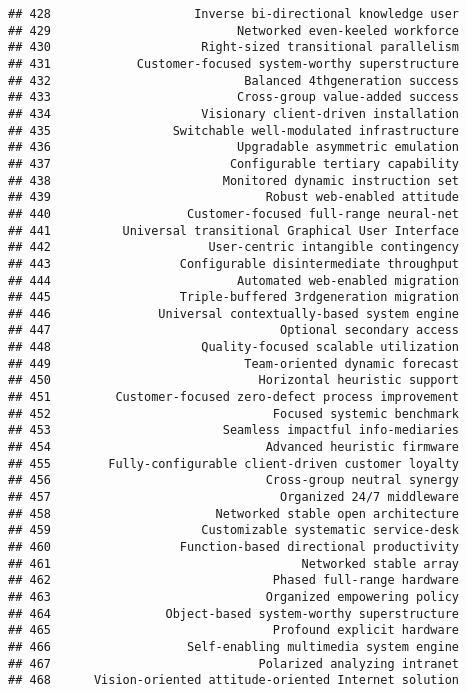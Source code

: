 \documentclass[
]{article}
\begin{document}
\begin{verbatim}
## 428                    Inverse bi-directional knowledge user
## 429                          Networked even-keeled workforce
## 430                     Right-sized transitional parallelism
## 431            Customer-focused system-worthy superstructure
## 432                           Balanced 4thgeneration success
## 433                          Cross-group value-added success
## 434                     Visionary client-driven installation
## 435                 Switchable well-modulated infrastructure
## 436                          Upgradable asymmetric emulation
## 437                         Configurable tertiary capability
## 438                        Monitored dynamic instruction set
## 439                              Robust web-enabled attitude
## 440                   Customer-focused full-range neural-net
## 441          Universal transitional Graphical User Interface
## 442                      User-centric intangible contingency
## 443                  Configurable disintermediate throughput
## 444                          Automated web-enabled migration
## 445                  Triple-buffered 3rdgeneration migration
## 446               Universal contextually-based system engine
## 447                                Optional secondary access
## 448                     Quality-focused scalable utilization
## 449                           Team-oriented dynamic forecast
## 450                             Horizontal heuristic support
## 451         Customer-focused zero-defect process improvement
## 452                               Focused systemic benchmark
## 453                        Seamless impactful info-mediaries
## 454                              Advanced heuristic firmware
## 455        Fully-configurable client-driven customer loyalty
## 456                              Cross-group neutral synergy
## 457                                Organized 24/7 middleware
## 458                       Networked stable open architecture
## 459                     Customizable systematic service-desk
## 460                  Function-based directional productivity
## 461                                   Networked stable array
## 462                               Phased full-range hardware
## 463                              Organized empowering policy
## 464                Object-based system-worthy superstructure
## 465                               Profound explicit hardware
## 466                   Self-enabling multimedia system engine
## 467                             Polarized analyzing intranet
## 468      Vision-oriented attitude-oriented Internet solution

\end{verbatim}
\end{document}
